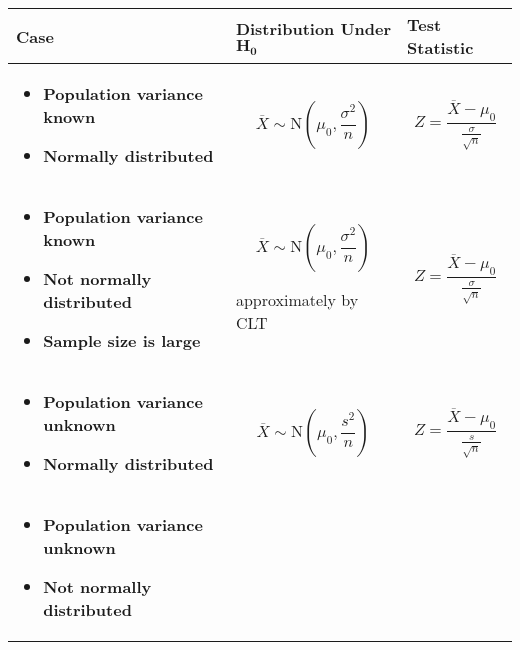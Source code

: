 \documentclass[11pt,a4paper]{book}
\begin{document}
\begin{center}
\begin{tabular}{|>{\raggedright}m{5.6cm}|>{\centering}m{5cm}|>{\centering}m{5cm}|}
\hline
\hspace{2.5cm}\textbf{Case} & \textbf{Distribution Under }$\boldsymbol{H_{0}}$ & \textbf{Test Statistic}\tabularnewline
\hline
\begin{itemize}[leftmargin=0.5cm]

\item \textbf{Population variance known}

\item \textbf{Normally distributed}

\end{itemize} &
\[
\overline{X}\sim\text{N}\left(\mu_{0},\frac{\sigma^{2}}{n}\right)
\]
 &
\[
{\displaystyle Z=\frac{\overline{X}-\mu_{0}}{\frac{\sigma}{\sqrt{n}}}}
\]
\tabularnewline
\hline
\begin{itemize}[leftmargin=0.5cm]

\item \textbf{Population variance known}

\item \textbf{Not normally distributed}

\item \textbf{Sample size is large}

\end{itemize} &
\[
\overline{X}\sim\text{N}\left(\mu_{0},\frac{\sigma^{2}}{n}\right)
\]

approximately by CLT &
\[
{\displaystyle Z=\frac{\overline{X}-\mu_{0}}{\frac{\sigma}{\sqrt{n}}}}
\]
\tabularnewline
\hline
\begin{itemize}[leftmargin=0.5cm]

\item \textbf{Population variance unknown}

\item \textbf{Normally distributed}

\end{itemize} &
\[
\overline{X}\sim\text{N}\left(\mu_{0},\frac{s^{2}}{n}\right)
\]
 &
\[
{\displaystyle Z=\frac{\overline{X}-\mu_{0}}{\frac{s}{\sqrt{n}}}}
\]
\tabularnewline
\hline
\begin{itemize}[leftmargin=0.5cm]

\item \textbf{Population variance unknown }

\item \textbf{Not normally distributed }


\end{itemize}
\end{tabular}
\end{center}
\end{document}
